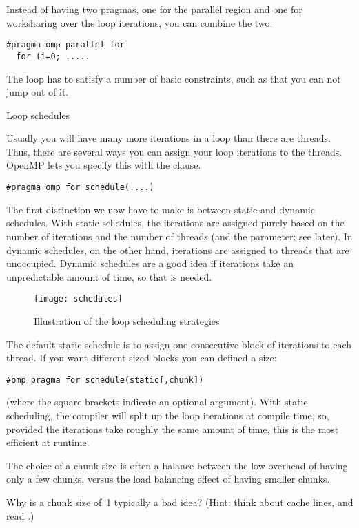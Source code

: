 Instead of having two pragmas, one for the parallel region and one for
worksharing over the loop iterations, you can combine the two:
\begin{verbatim}
#pragma omp parallel for
  for (i=0; .....
\end{verbatim}

The loop has to satisfy a number of basic constraints, such as that you can not
jump out of it.

 {Loop schedules}

Usually you will have many more iterations in a loop than there are threads.
Thus, there are several ways you can assign your loop iterations to the threads.
OpenMP lets you specify this with the  clause.
\begin{verbatim}
#pragma omp for schedule(....)
\end{verbatim}

The first distinction we now have to make is between static and dynamic schedules.
With static schedules, the iterations are assigned purely based on the number
of iterations and the number of threads (and the  parameter; see later).
In dynamic schedules, on the other hand, iterations are assigned to threads that
are unoccupied. Dynamic schedules are a good idea if iterations take an unpredictable
amount of time, so that  is needed.

\begin{figure}[ht]
  \texttt{[image: schedules]}
  \caption{Illustration of the loop scheduling strategies}
  \label{fig:omp-schedule}
\end{figure}

The default static schedule is to assign one consecutive block of iterations
to each thread. If you want different sized blocks you can defined a  size:
\begin{verbatim}
#omp pragma for schedule(static[,chunk])
\end{verbatim}
(where the square brackets indicate an optional argument).
With static scheduling, the compiler will split up the loop iterations at compile time,
so, provided the iterations take roughly the same amount of time, this is the most efficient at runtime.

The choice of a chunk size is often a balance between the low overhead of having 
only a few chunks, versus the load balancing effect of having smaller chunks.
\begin{exercise}
  Why is a chunk size of~1 typically a bad idea? (Hint: think about
  cache lines, and read .)
\end{exercise}

